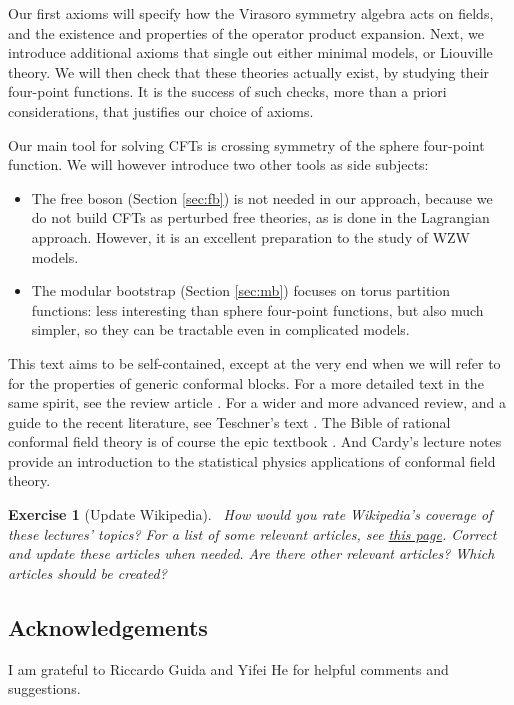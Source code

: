 \documentclass[12pt, a4paper]{article}
\theoremstyle{break}
\newtheorem{exo}{Exercise}[section]
\begin{document}
\begin{tcolorbox}
Our first axioms will specify how the Virasoro symmetry algebra acts on fields, and the existence and properties of the operator product expansion. 
Next, we introduce additional axioms that single out either minimal models, or Liouville theory.
We will then check that these theories actually exist, by studying their four-point functions.
It is the success of such checks, more than a priori considerations, that justifies our choice of axioms. 

Our main tool for solving CFTs is crossing symmetry of the sphere four-point function. We will however introduce two other tools as side subjects:
\begin{itemize}
 \item The free boson (Section \ref{sec:fb}) is not needed in our approach, because we do not build CFTs as perturbed free theories, as is done in the Lagrangian approach. However, it is an excellent preparation to the study of WZW models. 
 \item The modular bootstrap (Section \ref{sec:mb}) focuses on torus partition functions: less interesting than sphere four-point functions, but also much simpler, so they can be tractable even in complicated models. 
\end{itemize}
This text  aims to be self-contained, except at the very end when we will refer to \cite{zz90} for the properties of generic conformal blocks.
For a more detailed text in the same spirit, see the review article \cite{rib14}. For a wider and more advanced review, and a guide to the recent literature, see Teschner's text \cite{tes17}. 
The Bible of rational conformal field theory is of course the epic textbook \cite{fms97}. And Cardy's lecture notes \cite{car08} provide an introduction to the statistical physics applications of conformal field theory.

\begin{exo}[Update Wikipedia]
 ~\label{exo:wiki}
 How would you rate Wikipedia's coverage of these lectures' topics? For a list of some relevant articles, see 
 \href{https://en.wikipedia.org/wiki/User:Sylvain_Ribault/YRIS2019}{this page}.
 Correct and update these articles when needed. Are there other relevant articles? Which articles should be created?
\end{exo}

\subsection*{Acknowledgements}

I am grateful to Riccardo Guida and Yifei He for helpful comments and suggestions.

\end{tcolorbox}
\end{document}
